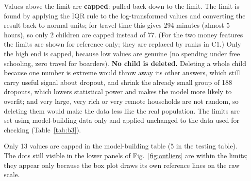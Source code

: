 \documentclass[conference,a4paper]{IEEEtran}
\begin{document}
Values above the limit are \textbf{capped}: pulled back down to the limit. The limit is found by applying the IQR rule to the log-transformed values and converting the result back to normal units; for travel time this gives 294 minutes (almost 5 hours), so only 2 children are capped instead of 77. (For the two money features the limits are shown for reference only; they are replaced by ranks in C1.) Only the high end is capped, because low values are genuine (no spending under free schooling, zero travel for boarders). \textbf{No child is deleted.} Deleting a whole child because one number is extreme would throw away its other answers, which still carry useful signal about dropout, and shrink the already small group of 188 dropouts, which lowers statistical power and makes the model more likely to overfit; and very large, very rich or very remote households are not random, so deleting them would make the data less like the real population. The limits are set using model-building data only and applied unchanged to the data used for checking (Table~\ref{tab:b3}).

Only 13 values are capped in the model-building table (5 in the testing table). The dots still visible in the lower panels of Fig.~\ref{fig:outliers} are within the limits; they appear only because the box plot draws its own reference lines on the raw scale.
\end{document}
